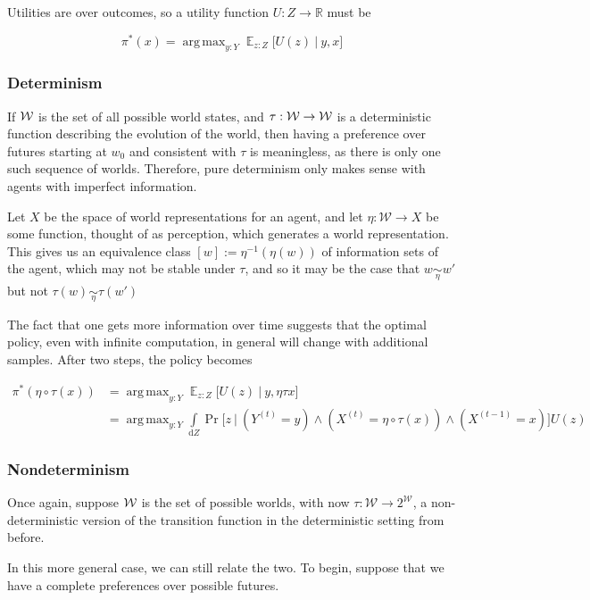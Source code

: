 \documentclass{book}
\DeclareMathOperator*{\argmax}{arg\,max}
\DeclareMathOperator*{\E}{\mathbb E}
\begin{document}
	Utilities are over outcomes, so a utility function $U : Z \to \mathbb R$ must be
	
	\[ \pi^*(x) = \argmax_{y: Y} \E_{z : Z} \Big[ U(z)~\Big|~ y,x\Big] \]
	
	\subsubsection{Determinism}
	If $\cal W$ is the set of all possible world states, and $\tau: \cal W \to W$ is a deterministic function describing the evolution of the world, then having a preference over futures starting at $w_0$ and consistent with $\tau$ is meaningless, as there is only one such sequence of worlds. Therefore, pure determinism only makes sense with agents with imperfect information. 
	
	Let $X$ be the space of world representations for an agent, and let $\eta: \mathcal W \to X$ be some function, thought of as perception, which generates a world representation. This gives us an equivalence class $[w] := \eta^{-1}(\eta(w))$ of information sets of the agent, which may not be stable under $\tau$, and so it may be the case that $w \underset\eta\sim w'$ but not $\tau(w) \underset\eta\sim \tau(w')$
	
	
	
	The fact that one gets more information over time suggests that the optimal policy, even with infinite computation, in general will change with additional samples. After two steps, the policy becomes
	
	\begin{align*}
		\pi^*(\eta\circ\tau (x)) &= \argmax_{y: Y} \E_{z : Z} \Big[ U(z)~\Big|~ y,\eta\tau x \Big]  \\
			&= \argmax_{y: Y} \int\limits_{\mathrm dZ} \Pr\Big[z~\Big|~\left(Y^{(t)} = y \right) \land \left(X^{(t)}= \eta \circ \tau (x)\right) \land \left(X^{(t-1)} = x \right) \Big] U(z)
	\end{align*}
		
	
	\subsubsection{Nondeterminism}
	Once again, suppose $\cal W$ is the set of possible worlds, with now $\tau: \mathcal W \to 2^{\mathcal W}$, a non-deterministic version of the transition function in the deterministic setting from before.
	
	In this more general case, we can still relate the two. To begin, suppose that we have a complete preferences over possible futures. 
	
\end{document}
